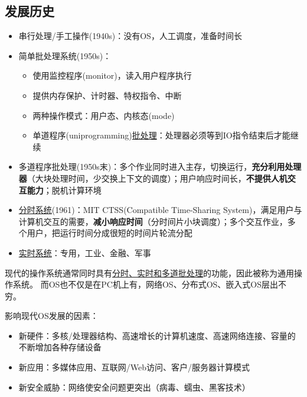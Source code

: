 \subsection{发展历史}
\begin{itemize}
	\item 串行处理/手工操作(1940s)：没有OS，人工调度，准备时间长
	\item 简单批处理系统(1950s)：
	\begin{itemize}
		\item 使用监控程序(monitor)，读入用户程序执行
		\item 提供内存保护、计时器、特权指令、中断
		\item 两种操作模式：用户态、内核态(mode)
		\item 单道程序(uniprogramming)\underline{批处理}：处理器必须等到IO指令结束后才能继续
	\end{itemize}
	\item 多道程序批处理(1950s末)：多个作业同时进入主存，切换运行，\textbf{充分利用处理器}（大块处理时间，少交换上下文的调度）；用户响应时间长，\textbf{不提供人机交互能力}；脱机计算环境
	\item \underline{分时系统}(1961)：MIT CTSS(Compatible Time-Sharing System)，满足用户与计算机交互的需要，\textbf{减小响应时间}（分时间片小块调度）；多个交互作业，多个用户，把运行时间分成很短的时间片轮流分配
	\item \underline{实时系统}：专用，工业、金融、军事
\end{itemize}

现代的操作系统通常同时具有\underline{分时、实时和多道批处理}的功能，因此被称为通用操作系统。
而OS也不仅是在PC机上有，网络OS、分布式OS、嵌入式OS层出不穷。


影响现代OS发展的因素：
\begin{itemize}
	\item 新硬件：多核/处理器结构、高速增长的计算机速度、高速网络连接、容量的不断增加各种存储设备
	\item 新应用：多媒体应用、互联网/Web访问、客户/服务器计算模式
	\item 新安全威胁：网络使安全问题更突出（病毒、蠕虫、黑客技术）
\end{itemize}


